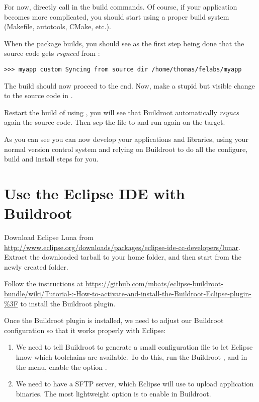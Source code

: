 For now, directly call  in the build commands. Of course, if
your application becomes more complicated, you should start using a
proper build system (Makefile, autotools, CMake, etc.).

When the package builds, you should see as the first step being done
that the  source code gets {\em rsynced} from
:

\begin{verbatim}
>>> myapp custom Syncing from source dir /home/thomas/felabs/myapp
\end{verbatim}

The build should now proceed to the end. Now, make a stupid but
visible change to the source code in .

Restart the build of  using , you
will see that Buildroot automatically {\em rsyncs} again the source
code. Then scp the file  to
 and run  again on the target.

As you can see you can now develop your applications and libraries,
using your normal version control system and relying on Buildroot to
do all the configure, build and install steps for you.

\section{Use the Eclipse IDE with Buildroot}

Download Eclipse Luna from
\url{http://www.eclipse.org/downloads/packages/eclipse-ide-cc-developers/lunar}.
Extract the downloaded tarball to your home folder, and
then start  from the newly created 
folder.

Follow the instructions at
\url{https://github.com/mbats/eclipse-buildroot-bundle/wiki/Tutorial-:-How-to-activate-and-install-the-Buildroot-Eclipse-plugin-%3F}
to install the Buildroot plugin.

Once the Buildroot plugin is installed, we need to adjust our Buildroot configuration so that it works properly with Eclipse:

\begin{enumerate}

\item We need to tell Buildroot to generate a small configuration file
  to let Eclipse know which toolchains are available. To do this, run
  the Buildroot , and in the  menu,
  enable the option .

\item We need to have a SFTP server, which Eclipse will use to upload
  application binaries. The most lightweight option is to enable
   in Buildroot.

\end{enumerate}

